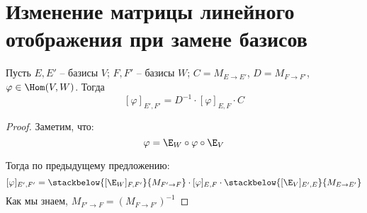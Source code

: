 \section{Изменение матрицы линейного отображения при замене базисов}
\follow Пусть $E, E'$ -- базисы $V$; $F, F'$ -- базисы $W$;
$C = M_{E \to E'}$, $D = M_{F \to F'}$, $\varphi \in \Hom(V, W)$.
Тогда 
$$ [\varphi]_{E', F'} = D^{-1} \cdot [\varphi]_{E, F} \cdot C $$
\begin{proof}
    Заметим, что:
    $$ \varphi = \E_W \circ \varphi \circ \E_V $$

    Тогда по предыдущему предложению:
    $$ [\varphi]_{E', F'} = 
    \stackbelow{[\E_W]_{F, F'}}{M_{F' \to F}} 
    \cdot [\varphi]_{E, F}
    \cdot \stackbelow{[\E_V]_{E', E}}{M_{E \to E'}}$$
    Как мы знаем, $M_{F' \to F} = \left(M_{F \to F'}\right)^{-1}$
\end{proof}